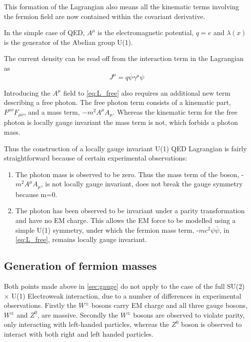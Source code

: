 This formation of the Lagrangian also means all the kinematic terms involving the fermion field are now contained within the covariant derivative.

In the simple case of QED, $A^{\mu}$ is the electromagnetic potential, $q = e$ and $\lambda(x)$ is the generator of the Abelian group U(1).

The current density can be read off from the interaction term in the Lagrangian as
\begin{equation}
  J^{\mu} = q\overline{\psi}\gamma^{\mu}\psi
\end{equation}

Introducing the $A^{\mu}$ field to \autoref{eq:L_free} also requires an additional new term describing a free photon. The free photon term consists of a kinematic part, $F^{\mu\nu}F_{\mu\nu}$, and a mass term, $-m^{2}A^{\mu}A_{\mu}$. Whereas the kinematic term for the free photon is locally gauge invariant the mass term is not, which forbids a photon mass.

Thus the construction of a locally gauge invariant U(1) QED Lagrangian is fairly straightforward because of certain experimental observations:
\begin{enumerate}
\item
  The photon mass is observed to be zero. Thus the mass term of the boson, -$m^{2}A^{\mu}A_{\mu}$, is not locally gauge invariant, does not break the gauge symmetry because m=0.
\item
  The photon has been observed to be invariant under a parity transformation and have no EM charge. This allows the EM force to be modelled using a  simple U(1) symmetry, under which the fermion mass term, -$mc^{2}\psi\overline{\psi}$, in \autoref{eq:L_free}, remains locally gauge invariant.

\end{enumerate}
\subsection{Generation of fermion masses}
Both points made above in \autoref{sec:gauge} do not apply to the case of the full SU(2) $\times$ U(1) Electroweak interaction, due to a number of differences in experimental observations. Firstly the $W^{\pm}$ bosons carry EM charge and all three gauge bosons, $W^{\pm}$ and $Z^{0}$, are massive. Secondly the $W^{\pm}$ bosons are observed to violate parity, only interacting with left-handed particles, whereas the $Z^{0}$ boson is observed to interact with both right and left handed particles. 

